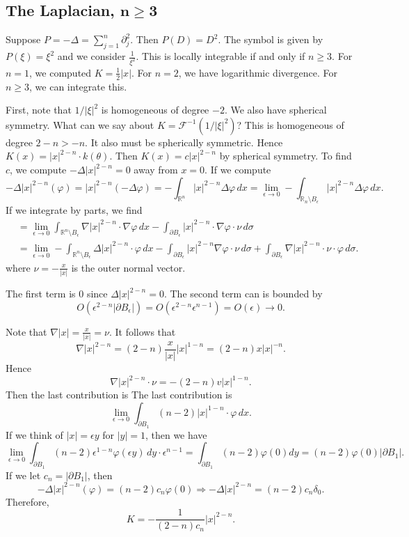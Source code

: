 \documentclass[11pt]{scrartcl}
\newcommand{\R}{\mathbb{R}}
\let \phi \varphi
\begin{document}
\subsection{The Laplacian, $ \mathbf{n \ge 3}$}
Suppose $P = -\Delta = \sum_{j=1}^n \partial_j^2$.  Then $P(D) = D^2$.  The symbol is given by $P(\xi) = \xi^2$ and we consider $\frac{1}{\xi^2}$.  This is locally integrable if and only if $n \ge 3$.  For $n = 1$, we computed $K = \frac{1}{2}|x|$.  For $n = 2$, we have logarithmic divergence.  For $n \ge 3$, we can integrate this.  

First, note that $1/|\xi|^2$ is homogeneous of degree $-2$.  We also have spherical symmetry.  What can we say about $K = \mathcal F^{-1}(1/|\xi|^2)$?  This is homogeneous of degree $2 - n > -n$.  It also must be spherically symmetric.  Hence $K(x) = |x|^{2-n} \cdot k(\theta)$.  Then $K(x) = c|x|^{2-n}$ by spherical symmetry.  To find $c$, we compute $-\Delta |x|^{2-n} = 0$ away from $x = 0$.  If we compute $$-\Delta |x|^{2-n}(\phi) = |x|^{2-n}(-\Delta \phi)= -\int_{\R^n} |x|^{2-n} \Delta \phi\, dx = \lim_{\epsilon \to 0} - \int_{\R_n\setminus B_\epsilon} |x|^{2-n} \Delta \phi \, dx.$$
If we integrate by parts, we find 
\begin{align*}
&= \lim_{\epsilon \to 0} \int_{\R^n \setminus B_\epsilon} \nabla |x|^{2-n} \cdot \nabla \phi\, dx - \int_{\partial B_\epsilon} |x|^{2-n} \cdot \nabla \phi \cdot \nu \, d\sigma\\
&= \lim_{\epsilon \to 0} -\int_{\R^n\setminus B_\epsilon} \Delta |x|^{2-n} \cdot\phi \, dx - \int_{\partial B_\epsilon} |x|^{2-n} \nabla \phi \cdot \nu \, d\sigma  +\int_{\partial B_\epsilon} \nabla |x|^{2-n} \cdot \nu \cdot \phi\,  d\sigma.
\end{align*}
where $\nu = -\frac{x}{|x|}$ is the outer normal vector.

The first term is $0$ since $\Delta |x|^{2-n} = 0$.  The second term can is bounded by 
$$O(\epsilon^{2-n} |\partial B_\epsilon|) = O(\epsilon^{2-n} \epsilon^{n-1}) = O(\epsilon) \to 0.$$


Note that $\nabla |x| = \frac{x}{|x|} = \nu$.  It follows that $$\nabla |x|^{2-n} = (2-n) \frac{x}{|x|} |x|^{1-n} = (2-n) x |x|^{-n}.$$
Hence $$\nabla |x|^{2-n} \cdot \nu = -(2 - n)v|x|^{1-n}.$$
Then the last contribution is 
The last contribution is 
$$\lim_{\epsilon \to 0} \int_{\partial B_1} (n-2)|x|^{1-n} \cdot \phi \,dx.$$
If we think of $|x| = \epsilon y$ for $|y| = 1$, then we have 
$$\lim_{\epsilon \to 0} \int_{\partial B_1} (n-2) \epsilon^{1-n} \phi(\epsilon y)\, dy \cdot \epsilon^{n-1}=  \int_{\partial B_1} (n-2) \phi(0) dy = (n-2) \phi(0)|\partial B_1|.$$
If we let $c_n = |\partial B_1|$, then
$$-\Delta |x|^{2-n}(\phi) = (n-2) c_n \phi(0) \Longrightarrow -\Delta |x|^{2-n} = (n-2)c_n \delta_0.$$
Therefore,
$$K = -\frac{1}{(2-n)c_n} |x|^{2-n}.$$
\end{document}
